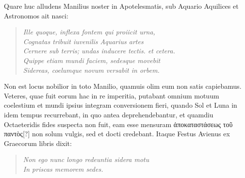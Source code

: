 %
Quare huc alludens Manilius noster in Apotelesmatis,
 sub Aquario
Aqui\-li\-ces et Astronomos ait nasci:
\begin{verse}
  \textit{Ille quoque, inflexa fontem qui proiicit urna,\\
  Cognatas tribuit iuvenilis Aquarius artes\\
  Cernere sub terris; undas inducere tectis. et cetera.\\
  Quippe etiam mundi faciem, sedesque movebit\\
  Sidereas, coelumque novum versabit in orbem.}
\end{verse}
Non est locus nobilior in toto Manilio, quamuis olim eum non satis
capiebamus.
Veteres, quae fuit eorum hac in re imperitia, putabant
omnium motuum coelestium et mundi ipsius integram conversionem
fieri, quando Sol et Luna in idem tempus recurrebant,
in quo antea deprehendebantur, et quamdiu Octaeteridis
fides suspecta non fuit, eam esse mensuram
 \textgreek{ἀποκαταστάσεως τοῦ παντὸς[?]}
non solum vulgis, sed et docti credebant.
Itaque Festus Avienus ex
Graecorum libris dixit:
\begin{verse}
  \textit{Non ego nunc longo redeuntia sidera motu\\
  In priscas memorem sedes. \emd{}}
\end{verse}
